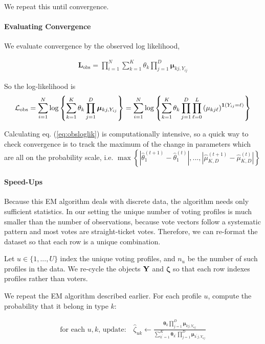 \documentclass[11pt]{article}
\begin{document}
We repeat this until convergence. 

\paragraph{Evaluating Convergence} We evaluate convergence by the observed log likelihood, 

\begin{align*}
\mathbf{L}_{\text{obs}} = \prod^N_{i=1}\sum^{K}_{k=1}\theta_k \prod^{D}_{j=1}\bm{\mu}_{kj,Y_{ij}}
\end{align*}

So the log-likelihood is
\begin{align}
\mathcal{L}_{\text{obs}} = \sum^{N}_{i=1}\log \left\{\sum^{K}_{k=1}\theta_k \prod^{D}_{j=1}\bm{\mu}_{kj,Y_{ij}}\right\} = \sum^{N}_{i=1}\log \left\{\sum^{K}_{k=1}\theta_k \prod^{D}_{j=1}\prod^{L}_{\ell = 0}\left(\mu_{kj\ell}\right)^{\bm{1}\left(Y_{ij} = \ell\right)}\right\} \label{eq:obsloglik}
\end{align}

Calculating eq. (\ref{eq:obsloglik}) is computationally intensive, so a quick way to check convergence is to track the maximum of the change in parameters which are all on the probability scale, i.e. \(\max\left\{|\widehat\theta^{(t + 1)}_{1} - \widehat\theta^{(t)}_{1}|, ..., |\widehat\mu^{(t + 1)}_{K,D} - \widehat\mu^{(t)}_{K,D}|\right\}\)

\paragraph{Speed-Ups} Because this EM algorithm deals with discrete data, the algorithm needs only sufficient statistics. In our setting the unique number of voting profiles is much smaller than the number of observations, because vote vectors follow a systematic pattern and most votes are straight-ticket votes. Therefore, we can re-format the dataset so that each row is a unique combination.

Let \(u \in \{1, ..., U\}\) index the unique voting profiles, and \(n_{u}\) be the number of such profiles in the data.  We re-cycle the objects \(\mathbf{Y}\) and \(\bm\zeta\) so that each row indexes profiles rather than voters.

We repeat the EM algorithm described earlier. For each profile \(u\), compute the probability that it belong in type \(k\):

\begin{align}
\text{for each \(u, k\), update: }~~~   \widehat\zeta_{uk} \leftarrow \frac{\bm{\theta}_{k}\prod^{D}_{j=1}\bm{\mu}_{kj,Y_{uj}}}
{\sum^{K}_{k^\prime=1}\bm{\theta}_{k^\prime}\prod^{D}_{j=1}\bm{\mu}_{k^\prime j,Y_{uj}}}
\end{align}
\end{document}
